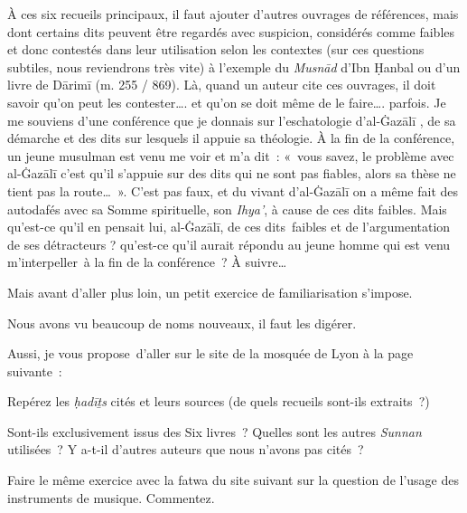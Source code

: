 À ces six recueils principaux, il faut ajouter d'autres ouvrages de
références, mais dont certains dits peuvent être regardés avec
suspicion, considérés comme faibles et donc contestés dans leur
utilisation selon les contextes (sur ces questions subtiles, nous
reviendrons très vite) à l'exemple du \emph{Musnād} d'Ibn Ḥanbal ou d'un
livre de Dārimī (m. 255 / 869). Là, quand un auteur cite ces ouvrages,
il doit savoir qu'on peut les contester\ldots. et qu'on se doit même de
le faire\ldots. parfois. Je me souviens d'une conférence que je donnais
sur l'eschatologie d'al-Ġazālī \label{theol:AlGazali17}, de sa démarche et des dits sur lesquels
il appuie sa théologie. À la fin de la conférence, un jeune musulman est
venu me voir et m'a dit~: «~vous savez, le problème avec al-Ġazālī c'est
qu'il s'appuie sur des dits qui ne sont pas fiables, alors sa thèse ne
tient pas la route\ldots~». C'est pas faux, et du vivant d'al-Ġazālī on
a même fait des autodafés avec sa Somme spirituelle, son \emph{Ihya'}, à
cause de ces dits faibles. Mais qu'est-ce qu'il en pensait lui,
al-Ġazālī, de ces dits~faibles et de l'argumentation de ses détracteurs
? qu'est-ce qu'il aurait répondu au jeune homme qui est venu
m'interpeller~à la fin de la conférence~? À suivre\ldots{}


Mais avant d'aller plus loin, un petit exercice de familiarisation
s'impose.

Nous avons vu beaucoup de noms nouveaux, il faut les digérer.

Aussi, je vous propose~d'aller sur le site de la mosquée de Lyon à la
page suivante~:


Repérez les \emph{ḥadīṯs} cités et leurs sources (de quels recueils
sont-ils extraits~?)

Sont-ils exclusivement issus des Six livres~? Quelles sont les autres
\emph{Sunnan} utilisées~? Y a-t-il d'autres auteurs que nous n'avons pas
cités~?

Faire le même exercice avec la fatwa du site suivant sur la question de
l'usage des instruments de musique. Commentez.
 \\



